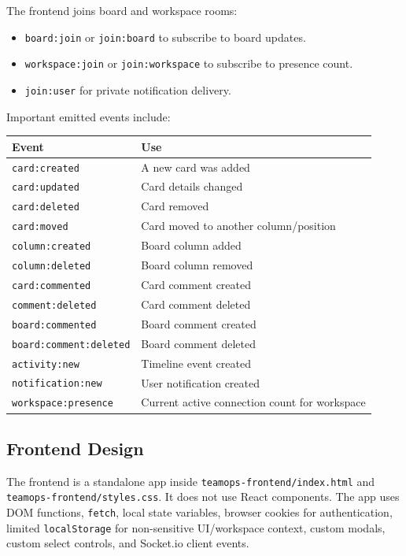 \documentclass[
]{article}
\providecommand{\tightlist}{%
  \setlength{\itemsep}{0pt}\setlength{\parskip}{0pt}}
\begin{document}
The frontend joins board and workspace rooms:

\begin{itemize}
\tightlist
\item
  \texttt{board:join} or \texttt{join:board} to subscribe to board
  updates.
\item
  \texttt{workspace:join} or \texttt{join:workspace} to subscribe to
  presence count.
\item
  \texttt{join:user} for private notification delivery.
\end{itemize}

Important emitted events include:

{\def\LTcaptype{} %
\begin{longtable}[]{@{}ll@{}}
\toprule\noalign{}
Event & Use \\
\midrule\noalign{}
\endhead
\bottomrule\noalign{}
\endlastfoot
\texttt{card:created} & A new card was added \\
\texttt{card:updated} & Card details changed \\
\texttt{card:deleted} & Card removed \\
\texttt{card:moved} & Card moved to another column/position \\
\texttt{column:created} & Board column added \\
\texttt{column:deleted} & Board column removed \\
\texttt{card:commented} & Card comment created \\
\texttt{comment:deleted} & Card comment deleted \\
\texttt{board:commented} & Board comment created \\
\texttt{board:comment:deleted} & Board comment deleted \\
\texttt{activity:new} & Timeline event created \\
\texttt{notification:new} & User notification created \\
\texttt{workspace:presence} & Current active connection count for
workspace \\
\end{longtable}
}

\subsection{Frontend Design}\label{frontend-design}

The frontend is a standalone app inside
\texttt{teamops-frontend/index.html} and
\texttt{teamops-frontend/styles.css}. It does not use React components.
The app uses DOM functions, \texttt{fetch}, local state variables,
browser cookies for authentication, limited \texttt{localStorage} for
non-sensitive UI/workspace context, custom modals, custom select
controls, and Socket.io client events.
\end{document}
